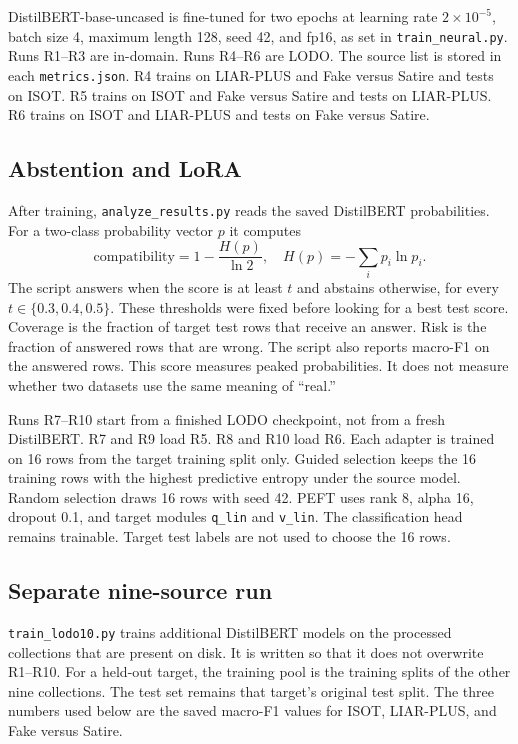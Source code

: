 \documentclass[conference,letterpaper]{IEEEtran}
\begin{document}
DistilBERT-base-uncased is fine-tuned for two epochs at learning rate $2\times10^{-5}$, batch size 4, maximum length 128, seed 42, and fp16, as set in \texttt{train\_neural.py}. Runs R1--R3 are in-domain. Runs R4--R6 are LODO. The source list is stored in each \texttt{metrics.json}. R4 trains on LIAR-PLUS and Fake versus Satire and tests on ISOT. R5 trains on ISOT and Fake versus Satire and tests on LIAR-PLUS. R6 trains on ISOT and LIAR-PLUS and tests on Fake versus Satire.

\subsection{Abstention and LoRA}
After training, \texttt{analyze\_results.py} reads the saved DistilBERT probabilities. For a two-class probability vector $p$ it computes
\begin{equation}
\mathrm{compatibility}=1-\frac{H(p)}{\ln 2},
\quad H(p)=-\sum_i p_i\ln p_i.
\end{equation}
The script answers when the score is at least $t$ and abstains otherwise, for every $t\in\{0.3,0.4,0.5\}$. These thresholds were fixed before looking for a best test score. Coverage is the fraction of target test rows that receive an answer. Risk is the fraction of answered rows that are wrong. The script also reports macro-F1 on the answered rows. This score measures peaked probabilities. It does not measure whether two datasets use the same meaning of ``real.''

Runs R7--R10 start from a finished LODO checkpoint, not from a fresh DistilBERT. R7 and R9 load R5. R8 and R10 load R6. Each adapter is trained on 16 rows from the target training split only. Guided selection keeps the 16 training rows with the highest predictive entropy under the source model. Random selection draws 16 rows with seed 42. PEFT uses rank 8, alpha 16, dropout 0.1, and target modules \texttt{q\_lin} and \texttt{v\_lin}. The classification head remains trainable. Target test labels are not used to choose the 16 rows.

\subsection{Separate nine-source run}
\texttt{train\_lodo10.py} trains additional DistilBERT models on the processed collections that are present on disk. It is written so that it does not overwrite R1--R10. For a held-out target, the training pool is the training splits of the other nine collections. The test set remains that target's original test split. The three numbers used below are the saved macro-F1 values for ISOT, LIAR-PLUS, and Fake versus Satire.
\end{document}
